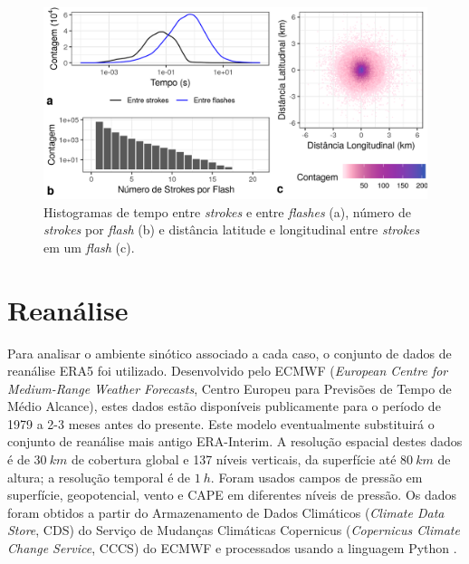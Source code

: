 \begin{figure}[htb]
	\begin{center}
		\caption{Histogramas de tempo entre \textit{strokes} e entre \textit{flashes} (a), número de \textit{strokes} por \textit{flash} (b) e distância latitude e longitudinal entre \textit{strokes} em um \textit{flash} (c).} 
		\label{flash_stats}
		\includegraphics[width=\columnwidth]{../Lightning_Processing/figures/brasildat_flash_stats_ptbr.png}
	\end{center}
\end{figure}

\section{Reanálise} \label{era5}

Para analisar o ambiente sinótico associado a cada caso, o conjunto de dados de reanálise ERA5 \cite{Copernicus2017} foi utilizado. Desenvolvido pelo ECMWF (\textit{European Centre for Medium-Range Weather Forecasts}, Centro Europeu para Previsões de Tempo de Médio Alcance), estes dados estão disponíveis publicamente para o período de 1979 a 2-3 meses antes do presente. Este modelo eventualmente substituirá o conjunto de reanálise mais antigo ERA-Interim. A resolução espacial destes dados é de $30\:km$ de cobertura global e 137 níveis verticais, da superfície até $80\:km$ de altura; a resolução temporal é de $1\:h$. Foram usados campos de pressão em superfície, geopotencial, vento e CAPE em diferentes níveis de pressão. Os dados foram obtidos a partir do Armazenamento de Dados Climáticos (\textit{Climate Data Store}, CDS) do Serviço de Mudanças Climáticas Copernicus (\textit{Copernicus Climate Change Service}, CCCS) do ECMWF e processados usando a linguagem Python \cite{PythonCoreTeam2018}.

